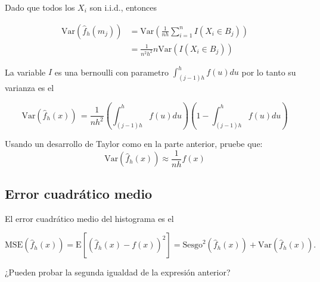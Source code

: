 \documentclass[
  12pt,
]{book}
\theoremstyle{definition}
\theoremstyle{definition}
\theoremstyle{definition}
\theoremstyle{remark}
\let\BeginKnitrBlock\begin \let\EndKnitrBlock\end
\begin{document}
Dado que todos los \(X_i\) son i.i.d., entonces

\begin{align*}
\mathrm{Var}\left( \hat{f}_h(m_j)\right) & =
\mathrm{Var}\left( \frac{1}{nh} \sum_{i = 1}^{n} I(X_i \in B_j)\right)                                  \\
& = \frac{1}{n^2h^2} n\mathrm{Var}\left( I(X_i \in B_j)\right)
\end{align*}

La variable \(I\) es una bernoulli con parametro \(\int_{(j - 1)h}^{h} f(u)du\) por lo tanto su varianza es el

\begin{equation*}
\mathrm{Var}\left( \hat{f}_h(x)\right)\, =
\frac{1}{nh^2} \left(\int_{(j - 1)h}^{h} f(u)du \right)\left( 1 -\int_{(j - 1)h}^{h} f(u)du \right)
\end{equation*}

\BeginKnitrBlock{exercise}
\protect\hypertarget{exr:unnamed-chunk-3}{}{\label{exr:unnamed-chunk-3} }Usando un desarrollo de Taylor como en la parte anterior, pruebe que:
\begin{equation*}
\mathrm{Var}\left( \hat{f}_h(x)\right)\approx
\frac{1}{nh} f(x)
\end{equation*}
\EndKnitrBlock{exercise}

\hypertarget{error-cuadruxe1tico-medio}{%
\subsection{Error cuadrático medio}\label{error-cuadruxe1tico-medio}}

El error cuadrático medio del histograma es el

\begin{equation*}
\mathrm{MSE}\left( \hat{f}_h(x)\right) =
\mathrm{E}\left[\left(\hat{f}_h(x) - f(x)\right)^2\right] = \mathrm{Sesgo}^2\left( \hat{f}_h(x)\right) + \mathrm{Var}\left( \hat{f}_h(x)\right).
\end{equation*}

\BeginKnitrBlock{exercise}
\protect\hypertarget{exr:unnamed-chunk-4}{}{\label{exr:unnamed-chunk-4} }¿Pueden probar la segunda igualdad de la expresión anterior?
\EndKnitrBlock{exercise}
\end{document}
